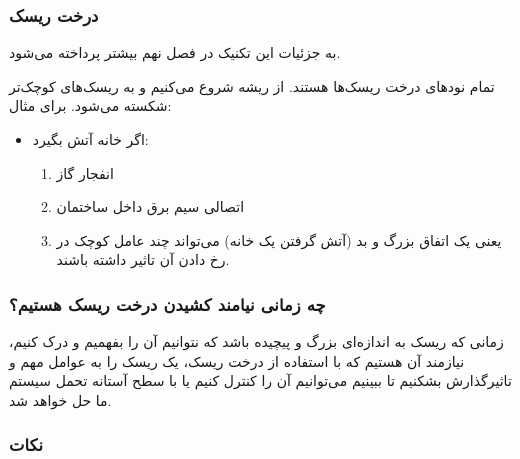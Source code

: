 \subsubsection{درخت ریسک}

به جزئیات این تکنیک در فصل نهم بیشتر پرداخته می‌شود.

تمام نود‌های درخت ریسک‌ها هستند. از ریشه شروع می‌کنیم و به ریسک‌های کوچک‌تر
شکسته می‌شود. برای مثال:

\begin{itemize}
    \item اگر خانه آتش بگیرد: \begin{enumerate}
        \item انفجار گاز
        \item اتصالی سیم برق داخل ساختمان
        \item یعنی یک اتفاق بزرگ و بد (آتش گرفتن یک خانه) می‌تواند چند عامل کوچک
        در رخ دادن آن تاثیر داشته باشند.
    \end{enumerate}
\end{itemize}

\subsubsection*{چه زمانی نیامند کشیدن درخت ریسک هستیم؟}

زمانی که ریسک به اندازه‌ای بزرگ و پیچیده باشد که نتوانیم آن را بفهمیم و درک
کنیم، نیازمند آن هستیم که با استفاده از درخت ریسک، یک ریسک را به عوامل مهم و
تاثیرگذارش بشکنیم تا ببینیم می‌توانیم آن را کنترل کنیم یا با سطح آستانه تحمل
سیستم ما حل خواهد شد.

\subsubsection*{نکات}

